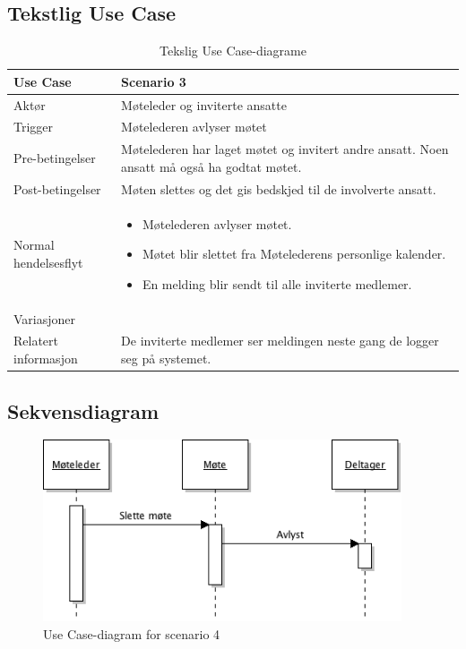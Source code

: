 \subsection{Tekstlig Use Case}
\begin{table}[H]
\centering
\label{tab:tuc4}
\begin{tabular}{| l | L{4in} |}
\hline
Use Case & Scenario 3 \\
\hline
Aktør & Møteleder og inviterte ansatte \\
\hline
Trigger & Møtelederen avlyser møtet \\
\hline
Pre-betingelser & Møtelederen har laget møtet og invitert andre ansatt. Noen ansatt må også ha godtat møtet. \\
\hline
Post-betingelser & Møten slettes og det gis bedskjed til de involverte ansatt. \\
\hline
Normal hendelsesflyt & 
\begin{minipage}{4in}
\vskip 4pt
\begin{itemize}
\item Møtelederen avlyser møtet.
\item Møtet blir slettet fra Møtelederens personlige kalender.
\item En melding blir sendt til alle inviterte medlemer.
\end{itemize}
\vskip 4pt
\end{minipage}
 \\
\hline
Variasjoner & \\
\hline
Relatert informasjon & De inviterte medlemer ser meldingen neste gang de logger seg på systemet. \\
\hline
\end{tabular}
\caption{Tekslig Use Case-diagrame}
\end{table}

\subsection{Sekvensdiagram}
\begin{figure}[H]
\label{fig:sek4}
\includegraphics[width=400px]{sekvens4.png}
\caption{Use Case-diagram for scenario 4}
\end{figure}